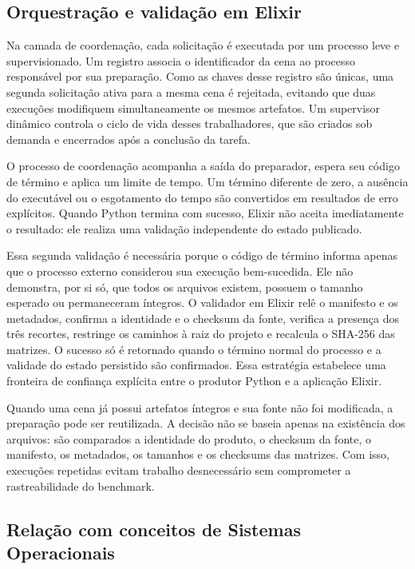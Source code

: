 \documentclass[tcc,capa]{texufpel}
\begin{document}
\subsection{Orquestração e validação em Elixir}

Na camada de coordenação, cada solicitação é executada por um processo leve e
supervisionado. Um registro associa o identificador da cena ao processo responsável
por sua preparação. Como as chaves desse registro são únicas, uma segunda
solicitação ativa para a mesma cena é rejeitada, evitando que duas execuções
modifiquem simultaneamente os mesmos artefatos. Um supervisor dinâmico controla o
ciclo de vida desses trabalhadores, que são criados sob demanda e encerrados após a
conclusão da tarefa.

O processo de coordenação acompanha a saída do preparador, espera seu código de
término e aplica um limite de tempo. Um término diferente de zero, a ausência do
executável ou o esgotamento do tempo são convertidos em resultados de erro
explícitos. Quando Python termina com sucesso, Elixir não aceita imediatamente o
resultado: ele realiza uma validação independente do estado publicado.

Essa segunda validação é necessária porque o código de término informa apenas que o
processo externo considerou sua execução bem-sucedida. Ele não demonstra, por si
só, que todos os arquivos existem, possuem o tamanho esperado ou permaneceram
íntegros. O validador em Elixir relê o manifesto e os metadados, confirma a
identidade e o checksum da fonte, verifica a presença dos três recortes, restringe
os caminhos à raiz do projeto e recalcula o SHA-256 das matrizes. O sucesso só é
retornado quando o término normal do processo e a validade do estado persistido são
confirmados. Essa estratégia estabelece uma fronteira de confiança explícita entre
o produtor Python e a aplicação Elixir.

Quando uma cena já possui artefatos íntegros e sua fonte não foi modificada, a
preparação pode ser reutilizada. A decisão não se baseia apenas na existência dos
arquivos: são comparados a identidade do produto, o checksum da fonte, o manifesto,
os metadados, os tamanhos e os checksums das matrizes. Com isso, execuções repetidas
evitam trabalho desnecessário sem comprometer a rastreabilidade do benchmark.

\subsection{Relação com conceitos de Sistemas Operacionais}
\end{document}
